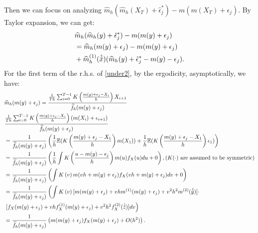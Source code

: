 \documentclass[a4paper]{article}
\begin{document}
Then we can focus on analyzing $\widehat{m}_h(\widehat{m}_h(X_T)+\hat{\epsilon}^*_{j}) - m(m(X_{T})+\epsilon_{j})$. By Taylor expansion, we can get:
\begin{equation}\label{under2}
\begin{split}
&\widehat{m}_h(\widehat{m}_h(y)+\hat{\epsilon}^*_{j}) - m(m(y)+\epsilon_{j})\\
&=\widehat{m}_h(m(y)+\epsilon_{j}) - m(m(y)+\epsilon_{j}) \\
& + \widehat{m}^{(1)}_h(\Hat{\Hat{x}})(\widehat{m}_h(y)+\hat{\epsilon}^*_{j} - m(y) -\epsilon_{j}).
\end{split}
\end{equation}
For the first term of the r.h.s. of \cref{under2}, by the ergodicity, asymptotically, we have:
\begin{equation}\label{under3}
\begin{split}
    &\widehat{m}_h(m(y)+\epsilon_{j}) = \frac{\frac{1}{Th}\sum_{i=0}^{T-1}K\left(\frac{m(y) + \epsilon_{j} - X_{i}}{h}   \right)X_{i+1}}{\widehat{f}_{h}(m(y)+\epsilon_j)}\\
    & \frac{\frac{1}{Th}\sum_{i=0}^{T-1}K\left( \frac{m(y) + \epsilon_{j} - X_{i}}{h}   \right)(m(X_i)+\epsilon_{i+1})}{\widehat{f}_{h}(m(y)+\epsilon_j)} \\
    & = \frac{1}{\widehat{f}_{h}(m(y)+\epsilon_j)}\left(\frac{1}{h}\mathbb{E}(K\left(\frac{m(y) + \epsilon_{j} - X_1}{h}\right)m(X_1)) + \frac{1}{h}\mathbb{E}(K\left( \frac{m(y) + \epsilon_{j} - X_1}{h}\right)\epsilon_1) \right)\\
    & = \frac{1}{\widehat{f}_{h}(m(y)+\epsilon_j)}\left(\frac{1}{h}\int K\left(\frac{u - m(y) - \epsilon_{j}}{h}\right)m(u)f_{X}(u)du   + 0\right), (K(\cdot)~\text{are assumed to be symmetric})\\
    & = \frac{1}{\widehat{f}_{h}(m(y)+\epsilon_j)}\left(\int K\left(v\right)m(vh + m(y)+\epsilon_j)f_{X}(vh + m(y)+\epsilon_j)dv   + 0\right)\\
    & = \frac{1}{\widehat{f}_{h}(m(y)+\epsilon_j)}\left(\int K\left(v\right)[m(m(y)+\epsilon_j)+vhm^{(1)}(m(y)+\epsilon_j)+v^2h^2m^{(2)}(\Hat{\Hat{y}})] \cdot    \right. \\
    & \left. [f_{X}(m(y)+\epsilon_j) + vhf^{(1)}_{X}(m(y)+\epsilon_j) + v^2h^2f^{(2)}_{X}(\Hat{\Hat{z}})  ]dv     \right)\\
    & = \frac{1}{\widehat{f}_{h}(m(y)+\epsilon_j)}\left(m(m(y)+\epsilon_j)f_{X}(m(y)+\epsilon_j) + O(h^2) \right).
\end{split}  
\end{equation}
\end{document}
